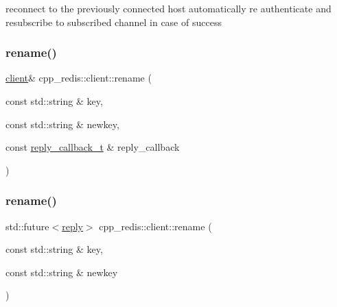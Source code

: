 reconnect to the previously connected host automatically re authenticate and resubscribe to subscribed channel in case of success \mbox{\label{classcpp__redis_1_1client_abbc2bb4b988d5e3e539d65d3eb9f511f}} 
\subsubsection{\texorpdfstring{rename()}{rename()}\hspace{0.1cm}{\footnotesize\ttfamily [1/2]}}
{\footnotesize\ttfamily \hyperlink{classcpp__redis_1_1client}{client}\& cpp\+\_\+redis\+::client\+::rename (\begin{DoxyParamCaption}\item[{const std\+::string \&}]{key,  }\item[{const std\+::string \&}]{newkey,  }\item[{const \hyperlink{classcpp__redis_1_1client_a061a1140d36d2eaeda82b09a0bb3f9f2}{reply\+\_\+callback\+\_\+t} \&}]{reply\+\_\+callback }\end{DoxyParamCaption})}

\mbox{\label{classcpp__redis_1_1client_a6a4ab4ac68aa92560569db6683bb591c}} 
\subsubsection{\texorpdfstring{rename()}{rename()}\hspace{0.1cm}{\footnotesize\ttfamily [2/2]}}
{\footnotesize\ttfamily std\+::future$<$\hyperlink{classcpp__redis_1_1reply}{reply}$>$ cpp\+\_\+redis\+::client\+::rename (\begin{DoxyParamCaption}\item[{const std\+::string \&}]{key,  }\item[{const std\+::string \&}]{newkey }\end{DoxyParamCaption})}

\mbox{\label{classcpp__redis_1_1client_a80b0abd5548ae3bfe22ed008767689c0}} 
